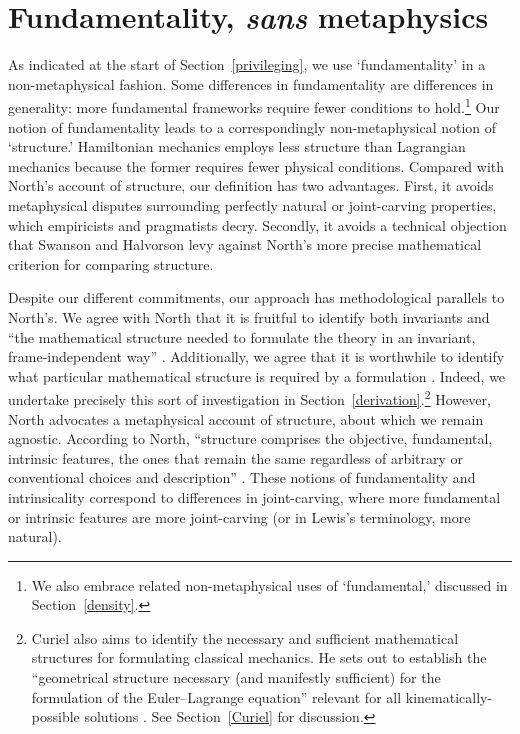 \documentclass[12pt, english, twoside]{article} %
\begin{document}
\section{Fundamentality, \textit{sans} metaphysics}
\label{fundamentality}

As indicated at the start of Section~\ref{privileging}, we use `fundamentality' in a non-metaphysical fashion. Some differences in fundamentality are differences in generality: more fundamental frameworks require fewer conditions to hold.\footnote{We also embrace related non-metaphysical uses of `fundamental,' discussed in Section~\ref{density}.} Our notion of fundamentality leads to a correspondingly non-metaphysical notion of `structure.' Hamiltonian mechanics employs less structure than Lagrangian mechanics because the former requires fewer physical conditions. Compared with North's \parencites*[]{North} account of structure, our definition has two advantages. First, it avoids metaphysical disputes surrounding perfectly natural or joint-carving properties, which empiricists and pragmatists decry. Secondly, it avoids a technical objection that Swanson and Halvorson \parencites*[]{Swanson} levy against North's more precise mathematical criterion for comparing structure. 

Despite our different commitments, our approach has methodological parallels to North's. We agree with North that it is fruitful to identify both invariants and ``the mathematical structure needed to formulate the theory in an invariant, frame-independent way'' \parencites*[65]{North}. Additionally, we agree that it is worthwhile to identify what particular mathematical structure is required by a formulation \parencites[78]{North}. Indeed, we undertake precisely this sort of investigation in Section~\ref{derivation}.\footnote{Curiel also aims to identify the necessary and sufficient mathematical structures for formulating classical mechanics. He sets out to establish the ``geometrical structure necessary (and manifestly sufficient) for the formulation of the Euler--Lagrange equation'' relevant for all kinematically-possible solutions \parencites*[292]{Curiel}. See Section~\ref{Curiel} for discussion.} However, North advocates a metaphysical account of structure, about which we remain agnostic. According to North, ``structure comprises the objective, fundamental, intrinsic features, the ones that remain the same regardless of arbitrary or conventional choices and description'' \parencites*[66]{North}. These notions of fundamentality and intrinsicality correspond to differences in joint-carving, where more fundamental or intrinsic features are more joint-carving (or in Lewis's \parencites*[]{Lewis1983} terminology, more natural). 
\end{document}
